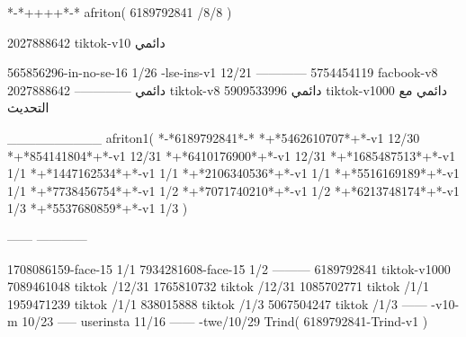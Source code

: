 *-*++++*-*
afriton(
6189792841 /8/8
)

2027888642 tiktok-v10
دائمي

565856296-in-no-se-16 1/26
-lse-ins-v1 12/21
------------
5754454119 facbook-v8
دائمي
--------------
2027888642 tiktok-v8
دائمي
5909533996 tiktok-v1000
دائمي مع التحديث

__________
afriton1(
*-*6189792841*-*
*+*5462610707*+*-v1 12/30
*+*854141804*+*-v1 12/31
*+*6410176900*+*-v1 12/31
*+*1685487513*+*-v1 1/1
*+*1447162534*+*-v1 1/1
*+*2106340536*+*-v1 1/1
*+*5516169189*+*-v1 1/1
*+*7738456754*+*-v1 1/2
*+*7071740210*+*-v1 1/2
*+*6213748174*+*-v1 1/3
*+*5537680859*+*-v1 1/3
)

------
------------

1708086159-face-15 1/1
7934281608-face-15 1/2
---------
6189792841 tiktok-v1000
7089461048 tiktok /12/31
1765810732 tiktok /12/31
1085702771 tiktok /1/1
1959471239 tiktok /1/1
838015888 tiktok /1/3
5067504247 tiktok /1/3
------
-v10-m 10/23
-----
userinsta 11/16
------
-twe/10/29
Trind(
6189792841-Trind-v1 
)
